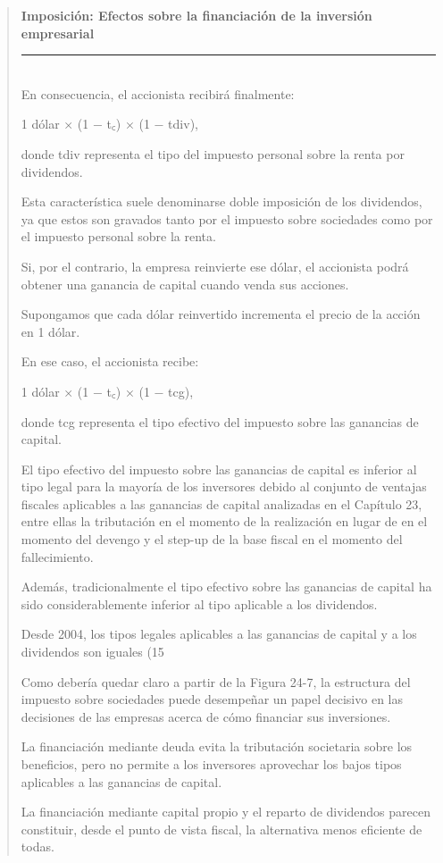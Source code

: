 \documentclass[10pt,a4paper]{article}
\newenvironment{specialblock}[1]{%
      \begin{quote} %
      \small %
      \noindent\textbf{#1}\\[-0.3em] %
      \rule{\linewidth}{0.4pt}\\[0.6em]}{
      \end{quote}}
\begin{document}
\begin{specialblock}{Imposición: Efectos sobre la financiación de la inversión empresarial}
    En consecuencia, el accionista recibirá finalmente:
    
    1 dólar × (1 − t꜀) × (1 − tdiv),
    
    donde tdiv representa el tipo del impuesto personal sobre la renta por dividendos.
    
    Esta característica suele denominarse doble imposición de los dividendos, ya que estos son gravados tanto por el impuesto sobre sociedades como por el impuesto personal sobre la renta.
    
    Si, por el contrario, la empresa reinvierte ese dólar, el accionista podrá obtener una ganancia de capital cuando venda sus acciones.
    
    Supongamos que cada dólar reinvertido incrementa el precio de la acción en 1 dólar.
    
    En ese caso, el accionista recibe:
    
    1 dólar × (1 − t꜀) × (1 − tcg),
    
    donde tcg representa el tipo efectivo del impuesto sobre las ganancias de capital.
    
    El tipo efectivo del impuesto sobre las ganancias de capital es inferior al tipo legal para la mayoría de los inversores debido al conjunto de ventajas fiscales aplicables a las ganancias de capital analizadas en el Capítulo 23, entre ellas la tributación en el momento de la realización en lugar de en el momento del devengo y el step-up de la base fiscal en el momento del fallecimiento.
    
    Además, tradicionalmente el tipo efectivo sobre las ganancias de capital ha sido considerablemente inferior al tipo aplicable a los dividendos.
    
    Desde 2004, los tipos legales aplicables a las ganancias de capital y a los dividendos son iguales (15 %
    
    Como debería quedar claro a partir de la Figura 24-7, la estructura del impuesto sobre sociedades puede desempeñar un papel decisivo en las decisiones de las empresas acerca de cómo financiar sus inversiones.
    
    La financiación mediante deuda evita la tributación societaria sobre los beneficios, pero no permite a los inversores aprovechar los bajos tipos aplicables a las ganancias de capital.
    
    La financiación mediante capital propio y el reparto de dividendos parecen constituir, desde el punto de vista fiscal, la alternativa menos eficiente de todas.
    

\end{specialblock}
\end{document}
